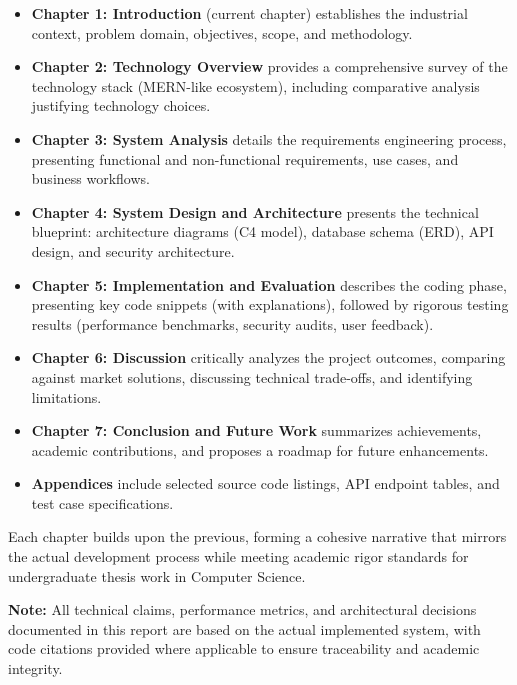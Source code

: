 \begin{itemize}
    \item \textbf{Chapter 1: Introduction} (current chapter) establishes the industrial context, problem domain, objectives, scope, and methodology.
    
    \item \textbf{Chapter 2: Technology Overview} provides a comprehensive survey of the technology stack (MERN-like ecosystem), including comparative analysis justifying technology choices.
    
    \item \textbf{Chapter 3: System Analysis} details the requirements engineering process, presenting functional and non-functional requirements, use cases, and business workflows.
    
    \item \textbf{Chapter 4: System Design and Architecture} presents the technical blueprint: architecture diagrams (C4 model), database schema (ERD), API design, and security architecture.
    
    \item \textbf{Chapter 5: Implementation and Evaluation} describes the coding phase, presenting key code snippets (with explanations), followed by rigorous testing results (performance benchmarks, security audits, user feedback).
    
    \item \textbf{Chapter 6: Discussion} critically analyzes the project outcomes, comparing against market solutions, discussing technical trade-offs, and identifying limitations.
    
    \item \textbf{Chapter 7: Conclusion and Future Work} summarizes achievements, academic contributions, and proposes a roadmap for future enhancements.
    
    \item \textbf{Appendices} include selected source code listings, API endpoint tables, and test case specifications.
\end{itemize}

Each chapter builds upon the previous, forming a cohesive narrative that mirrors the actual development process while meeting academic rigor standards for undergraduate thesis work in Computer Science.

\vspace{1cm}
\noindent \textbf{Note:} All technical claims, performance metrics, and architectural decisions documented in this report are based on the actual implemented system, with code citations provided where applicable to ensure traceability and academic integrity.

